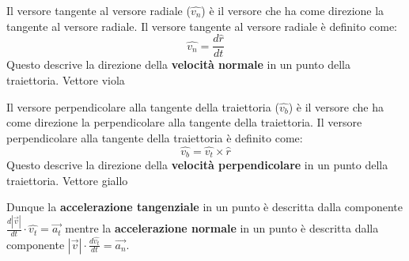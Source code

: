         \begin{definition}
            Il versore tangente al versore radiale ($\hat{v_n}$) è il versore che ha come direzione la tangente al versore radiale. Il versore tangente al versore radiale è definito come:
            $$
                \hat{v_n} = \frac{d\hat{r}}{dt}
            $$
            Questo descrive la direzione della \textbf{velocità normale} in un punto della traiettoria.
            {\footnotesize Vettore viola}
        \end{definition}
        \begin{definition}
            Il versore perpendicolare alla tangente della traiettoria ($\hat{v_b}$) è il versore che ha come direzione la perpendicolare alla tangente della traiettoria. Il versore perpendicolare alla tangente della traiettoria è definito come:
            $$
                \hat{v_b} = \hat{v_t}\times\hat{r}
            $$
            Questo descrive la direzione della \textbf{velocità perpendicolare} in un punto della traiettoria.
            {\footnotesize Vettore giallo}
        \end{definition}
        Dunque la \textbf{accelerazione tangenziale} in un punto è descritta dalla componente $ \frac{d|\vec{v}|}{dt}\cdot\hat{v_t} = \vec{a_t} $ mentre la \textbf{accelerazione normale} in un punto è descritta dalla componente $ \left|\vec{v}\right|\cdot\frac{d\hat{v_t}}{dt} = \vec{a_n} $.
